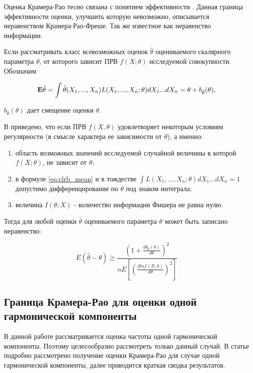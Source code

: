 Оценка Крамера-Рао тесно связана с понятием эффективности . Данная граница эффективности оценки, улучшить которую невозможно, описывается
неравенством Крамера-Рао-Фреше. Так же известное как неравенство информации.

Если рассматривать класс всевозможных оценок ${\hat{\theta}}$ оцениваемого скалярного параметра ${\theta}$, от которого зависит ПРВ ${f(X; \theta)}$
исследуемой совокупности. Обозначим
\begin{center}
\begin{equation}
	\label{eq:clrb_mean}
	{\bf{E}} \hat{\theta} = \int \hat{\theta} (X_1, ..., X_n)L(X_1, ..., X_n; \theta) dX_1 ... dX_n= \theta + b_{\hat{\theta}}(\theta),
\end{equation}
\end{center}
${b_{\hat{\theta}}(\theta)}$ дает смещение оценки ${\theta}$.

В \cite{ayvazyan-book} приведено, что если  ПРВ ${f(X, \theta)}$  
удовлетворяет некоторым  условиям регулярности (в смысле характера ее зависимости от ${\theta}$), а именно:
\begin{enumerate}
\item область возможных значений исследуемой случайной величины в которой ${f(X; \theta)}$, не зависит от ${\theta}$;
\item в формуле \ref{eq:clrb_mean} и в тождестве ${\int L(X_1, ..., X_n;\theta) dX_1...dX_n = 1}$ допустимо дифференцирование по ${\theta}$ под знаком интеграла;
\item величина ${I(\theta; X)}$ - количество информации Фишера не равна нулю.
\end{enumerate}

Тогда для любой оценки ${\hat{\theta}}$ оцениваемого параметра ${\theta}$ может быть записано неравенство:
\begin{center}
\begin{equation}
	\label{eq:crlb_base3}
	E(\hat{\theta} - \theta) \ge \frac{(1 + \frac{d b_{\hat{\theta}} (\theta)}{d \theta})^2}{n E \left[ \left( \frac{d ln f(X; \theta)}{d \theta} \right)^2 \right]}
\end{equation}
\end{center}

\subsection{Граница Крамера-Рао для оценки одной гармонической компоненты}
В данной работе рассматривается оценка частоты одной гармонической компоненты. Поэтому целесообразно рассмотреть только данный случай. В статье \cite{rife-crlb-article}
подробно рассмотрено получение оценки Крамера-Рао для случае одной гармонической компоненты, далее приводится краткая сводка результатов.

